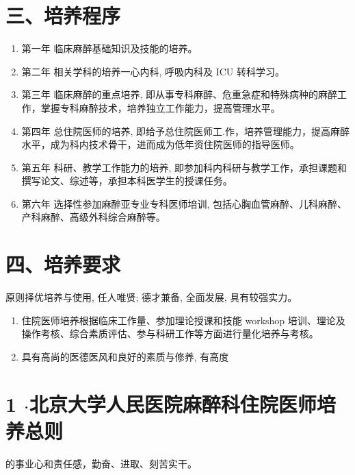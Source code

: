 \documentclass[10pt]{article}
\begin{document}
\section*{三、培养程序}
\begin{enumerate}
  \item 第一年 临床麻醉基础知识及技能的培养。

  \item 第二年 相关学科的培养一心内科, 呼吸内科及 ICU 转科学习。

  \item 第三年 临床麻醉的重点培养, 即从事专科麻醉、危重急症和特殊病种的麻醉工作，掌握专科麻醉技术，培养独立工作能力，提高管理水平。

  \item 第四年 总住院医师的培养, 即给予总住院医师工.作，培养管理能力，提高麻醉水平，成为科内技术骨干，进而成为低年资住院医师的指导医师。

  \item 第五年 科研、教学工作能力的培养, 即参加科内科研与教学工作，承担课题和撰写论文、综述等，承担本科医学生的授课任务。

  \item 第六年 选择性参加麻醉亚专业专科医师培训, 包括心胸血管麻醉、儿科麻醉、产科麻醉、高级外科综合麻醉等。

\end{enumerate}

\section*{四、培养要求}
原则择优培养与使用, 任人唯贤; 德才兼备, 全面发展, 具有较强实力。

\begin{enumerate}
  \item 住院医师培养根据临床工作量、参加理论授课和技能 workshop 培训、理论及操作考核、综合素质评估、参与科研工作等方面进行量化培养与考核。

  \item 具有高尚的医德医风和良好的素质与修养, 有高度

\end{enumerate}

\section*{1 $\cdot$北京大学人民医院麻醉科住院医师培养总则}
的事业心和责任感，勤奋、进取、刻苦实干。
\end{document}
